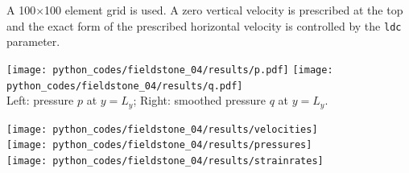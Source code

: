 \newpage
A 100$\times$100 element grid is used. 
A zero vertical velocity is prescribed at the top and the exact form of the 
prescribed horizontal velocity is controlled by the {\tt ldc} parameter.

\begin{center}
\texttt{[image: python\_codes/fieldstone\_04/results/p.pdf]}
\texttt{[image: python\_codes/fieldstone\_04/results/q.pdf]}\\
{\captionfont Left: pressure $p$ at $y=L_y$; Right: smoothed pressure $q$ at $y=L_y$.}
\end{center}

\begin{center}
\texttt{[image: python\_codes/fieldstone\_04/results/velocities]}\\
\texttt{[image: python\_codes/fieldstone\_04/results/pressures]}\\
\texttt{[image: python\_codes/fieldstone\_04/results/strainrates]}
\end{center}

